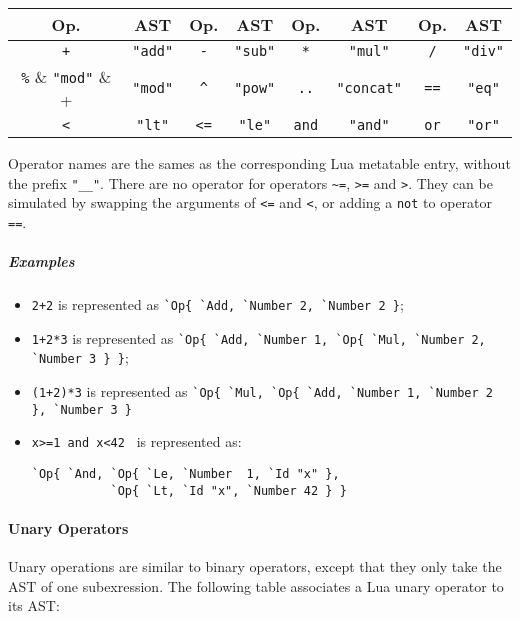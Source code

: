 \begin{center}
\begin{tabular}{|c|c||c|c||c|c||c|c|}
  \hline
  \bf Op. & \bf AST & 
  \bf Op. & \bf AST & 
  \bf Op. & \bf AST & 
  \bf Op. & \bf AST \\
  
  \hline\hline %
  \verb|+|   & \verb+"add"+    & 
  \verb+-+   & \verb+"sub"+    & 
  \verb+*+   & \verb+"mul"+    & 
  \verb+/+   & \verb+"div"+    \\
  \hline %
  \verb+%+   & \verb+"mod"+    & 
  \verb+^+   & \verb+"pow"+    & 
  \verb+..+  & \verb+"concat"+ & 
  \verb+==+  & \verb+"eq"+     \\
  \hline %
  \verb+<+   & \verb+"lt"+     &
  \verb+<=+  & \verb+"le"+     & 
  \verb+and+ & \verb+"and"+    & 
  \verb+or+  & \verb+"or"+     \\
  \cline{1-6} %
\end{tabular}
\end{center}

Operator names are the sames as the corresponding Lua metatable entry,
without the prefix \verb+"__"+. There are no operator for operators
\verb+~=+, \verb+>=+ and \verb+>+. They can be simulated by swapping
the arguments of \verb+<=+ and \verb+<+, or adding a \verb+not+ to
operator \verb+==+.

\subparagraph{Examples}
\begin{itemize}
\item \verb|2+2| is represented as
  \verb|`Op{ `Add, `Number 2, `Number 2 }|;
\item \verb|1+2*3| is represented as
  \verb|`Op{ `Add, `Number 1, `Op{ `Mul, `Number 2, `Number 3 } }|;
\item \verb|(1+2)*3| is represented as
  \verb|`Op{ `Mul, `Op{ `Add, `Number 1, `Number 2 }, `Number 3 }|
\item \verb|x>=1 and x<42 | is represented as:
\begin{verbatim}
`Op{ `And, `Op{ `Le, `Number  1, `Id "x" },
           `Op{ `Lt, `Id "x", `Number 42 } }

\end{verbatim}
\end{itemize}

\paragraph{Unary Operators}
Unary operations are similar to binary operators, except that they
only take the AST of one subexression.  The following table associates
a Lua unary operator to its AST:

